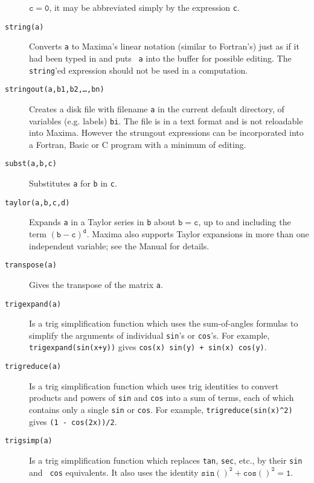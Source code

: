 \documentclass[a4paper,12pt]{article}
\begin{document}
\begin{description}
  $\mathtt{c = 0}$, it may be abbreviated simply by the expression
  {\tt c}.
\item[{\tt string(a)}] Converts {\tt a} to Maxima's linear notation
  (similar to Fortran's) just as if it had been typed in and puts {\tt
    a} into the buffer for possible editing.  The {\tt string}'ed
  expression should not be used in a computation.
\item[{\tt stringout(a,b1,b2,\ldots,bn)}] Creates a disk file with
  filename {\tt a} in the current default directory, of variables
  (e.g. labels) {\tt bi}.  The file is in a text format and is not
  reloadable into Maxima. However the strungout expressions can be
  incorporated into a Fortran, Basic or C program with a minimum of
  editing.
\item[{\tt subst(a,b,c)}] Substitutes {\tt a} for {\tt b} in {\tt c}.
\item[{\tt taylor(a,b,c,d)}] Expands {\tt a} in a Taylor series in
  {\tt b} about $\mathtt{b=c}$, up to and including the term
  $\mathtt{(b-c)^d}$.  Maxima also supports Taylor expansions in more
  than one independent variable; see the Manual for details.
\item[{\tt transpose(a)}] Gives the transpose of the matrix {\tt a}.
\item[{\tt trigexpand(a)}] Is a trig simplification function which
  uses the sum-of-angles formulas to simplify the arguments of
  individual {\tt sin}'s or {\tt cos}'s.  For example, {\tt
    trigexpand(sin(x+y))} gives {\tt cos(x) sin(y) + sin(x) cos(y)}.
\item[{\tt trigreduce(a)}] Is a trig simplification function which
  uses trig identities to convert products and powers of {\tt sin} and
  {\tt cos} into a sum of terms, each of which contains only a single
  {\tt sin} or {\tt cos}.  For example, \verb+trigreduce(sin(x)^2)+
  gives {\tt (1 - cos(2x))/2}.
\item[{\tt trigsimp(a)}] Is a trig simplification function which
  replaces {\tt tan}, {\tt sec}, etc., by their {\tt sin} and {\tt
    cos} equivalents.  It also uses the identity $\mathtt{sin()^2 +
    cos()^2 = 1}$.
\end{description}
\end{document}
